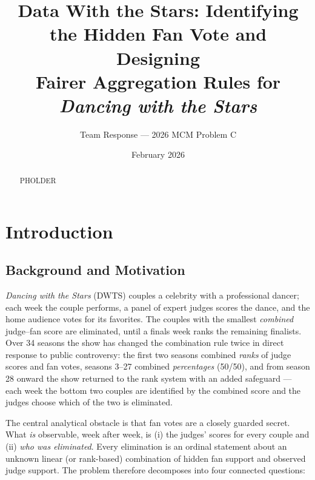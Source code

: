 \documentclass[11pt]{article}
\title{Data With the Stars: Identifying the Hidden Fan Vote and Designing\\
Fairer Aggregation Rules for \emph{Dancing with the Stars}}
\author{Team Response --- 2026 MCM Problem C}
\date{February 2026}
\begin{document}
\maketitle

\begin{abstract}
PHOLDER
\end{abstract}

\tableofcontents
\newpage

\section{Introduction}
\label{sec:intro}

\subsection{Background and Motivation}

\emph{Dancing with the Stars} (DWTS) couples a celebrity with a professional dancer;
each week the couple performs, a panel of expert judges scores the dance, and the
home audience votes for its favorites. The couples with the smallest
\emph{combined} judge--fan score are eliminated, until a finals week ranks the
remaining finalists. Over 34 seasons the show has changed the combination rule
twice in direct response to public controversy: the first two seasons combined
\emph{ranks} of judge scores and fan votes, seasons 3--27 combined \emph{percentages}
(50/50), and from season 28 onward the show returned to the rank system with an
added safeguard --- each week the bottom two couples are identified by the combined
score and the judges choose which of the two is eliminated.

The central analytical obstacle is that fan votes are a closely guarded secret.
What \emph{is} observable, week after week, is (i) the judges' scores for every
couple and (ii) \emph{who was eliminated}. Every elimination is an ordinal statement
about an unknown linear (or rank-based) combination of hidden fan support and
observed judge support. The problem therefore decomposes into four connected
questions:
\end{document}
